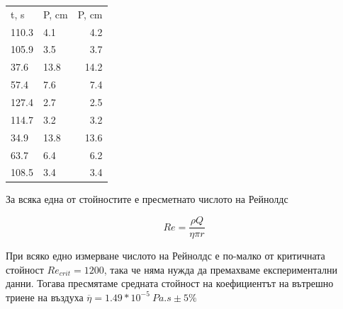 \documentclass[%
 reprint,
 amsmath,amssymb,
 aps,
]{revtex4-2}
\begin{document}
\begin{table}[H]
    \centering
    \begin{tabular}{@{}llr@{}} \toprule
    t, s  & P, cm & P, cm \\
    110.3 & 4.1        & 4.2        \\
    105.9 & 3.5        & 3.7        \\
    37.6  & 13.8       & 14.2       \\
    57.4  & 7.6        & 7.4        \\
    127.4 & 2.7        & 2.5        \\
    114.7 & 3.2        & 3.2        \\
    34.9  & 13.8       & 13.6       \\
    63.7  & 6.4        & 6.2        \\
    108.5 & 3.4        & 3.4        \\
    \bottomrule
    \end{tabular}%
\end{table}

За всяка една от стойностите е пресметнато числото на Рейнолдс 

\begin{equation*}
    Re = \frac{\rho Q}{\eta \pi r} 
\end{equation*}

При всяко едно измерване числото на Рейнолдс е по-малко от критичната стойност $Re_{crit} = 1200$, така че няма нужда да премахваме експериментални данни. Тогава пресмятаме средната стойност на коефициентът на вътрешно триене на въздуха $\overline{\eta} = 1.49*10^{-5} \ \si{Pa.s} \pm 5\%$
\end{document}
